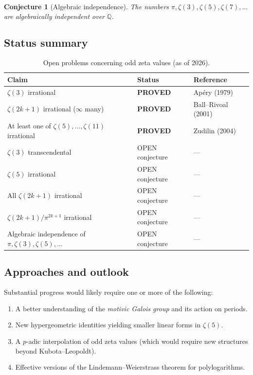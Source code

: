 \documentclass[12pt,a4paper]{amsart}
\newtheorem{conjecture}[theorem]{Conjecture}
\theoremstyle{definition}
\theoremstyle{remark}
\begin{document}
\begin{conjecture}[Algebraic independence]
  The numbers $\pi, \zeta(3), \zeta(5), \zeta(7), \ldots$ are algebraically
  independent over $\mathbb{Q}$.
\end{conjecture}

\subsection*{Status summary}

\begin{table}[h]
  \centering
  \caption{Open problems concerning odd zeta values (as of 2026).}
  \vspace{4pt}
  \begin{tabular}{@{}lll@{}}
    \toprule
    Claim & Status & Reference \\
    \midrule
    $\zeta(3)$ irrational & \textbf{PROVED} & Apéry (1979) \\
    $\zeta(2k+1)$ irrational ($\infty$ many) & \textbf{PROVED} & Ball--Rivoal (2001) \\
    At least one of $\zeta(5),\ldots,\zeta(11)$ irrational & \textbf{PROVED} & Zudilin (2004) \\
    $\zeta(3)$ transcendental & OPEN conjecture & --- \\
    $\zeta(5)$ irrational & OPEN conjecture & --- \\
    All $\zeta(2k+1)$ irrational & OPEN conjecture & --- \\
    $\zeta(2k+1)/\pi^{2k+1}$ irrational & OPEN conjecture & --- \\
    Algebraic independence of $\pi, \zeta(3), \zeta(5), \ldots$ & OPEN conjecture & --- \\
    \bottomrule
  \end{tabular}
\end{table}

\subsection*{Approaches and outlook}

Substantial progress would likely require one or more of the following:
\begin{enumerate}[leftmargin=2em]
  \item A better understanding of the \emph{motivic Galois group} and its action
        on periods.
  \item New hypergeometric identities yielding smaller linear forms in $\zeta(5)$.
  \item A $p$-adic interpolation of odd zeta values (which would require new
        structures beyond Kubota--Leopoldt).
  \item Effective versions of the Lindemann--Weierstrass theorem for polylogarithms.
\end{enumerate}
\end{document}
